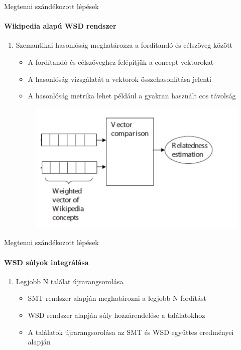 \begin{frame}{Megtenni szándékozott lépések}
\framesubtitle{Wikipedia alapú WSD rendszer}

	\begin{enumerate}
		\restorecounter	
	
		\item Szemantikai hasonlóság meghatározza a fordítandó és célszöveg között
		\begin{itemize}
			\item A fordítandó és célszöveghez felépítjük a concept vektorokat
			\item A hasonlóság vizsgálatát a vektorok összehasonlítása jelenti
			\item A hasonlóság metrika lehet például a gyakran használt cos távolság
		\end{itemize}
	
		\begin{figure}[t]
			\includegraphics[scale=0.4]{images/similarity}
 		\end{figure}	
	
		\savecounter
	\end{enumerate}

\end{frame}

\begin{frame}{Megtenni szándékozott lépések}
\framesubtitle{WSD súlyok integrálása}	
	
	\begin{enumerate}
		\restorecounter
						
		\item Legjobb N találat újrarangsorolása
		\begin{itemize}
			\item SMT rendszer alapján meghatározni a legjobb N fordítást
			\item WSD rendszer alapján súly hozzárendelése a találatokhoz
			\item A találatok újrarangsorolása az SMT és WSD együttes eredményei alapján
		\end{itemize}
	\end{enumerate}
	
\end{frame}